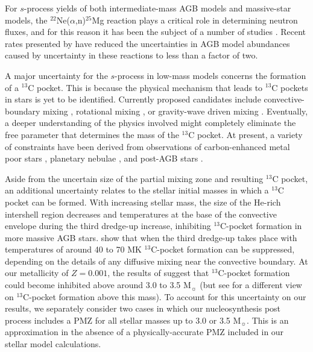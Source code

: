 For $s$-process yields of both intermediate-mass AGB models and massive-star models, the $^{22}$Ne($\alpha$,n)$^{25}$Mg reaction plays a critical role in determining neutron fluxes, and for this reason it has been the subject of a number of studies \citep{Angulo:1999kp,Jaeger:2001ch,Koehler:2002cf,Karakas:2006fk}. Recent rates presented by \citet{Longland:2012ix} have reduced the uncertainties in AGB model abundances caused by uncertainty in these reactions to less than a factor of two.

A major uncertainty for the $s$-process in low-mass models concerns the formation of a $^{13}$C pocket. This is because the physical mechanism that leads to $^{13}$C pockets in stars is yet to be identified. Currently proposed candidates include convective-boundary mixing \citep{Herwig:2000ua,Cristallo:2004us}, rotational mixing \citep{Herwig:2001vb,Piersanti:2013dh}, or gravity-wave driven mixing \citep{Denissenkov:2003gx}. Eventually, a deeper understanding of the physics involved might completely eliminate the free parameter that determines the mass of the $^{13}$C pocket. At present, a variety of constraints have been derived from observations of carbon-enhanced metal poor stars \citep{Izzard:2009hg,Bisterzo:2012bf,Lugaro:2012ht}, planetary nebulae \citep{Shingles:2013kg,Miszalski:2013gi}, and post-AGB stars \citep{BonacicMarinovic:2007jl,DeSmedt:2012dp}.

Aside from the uncertain size of the partial mixing zone and resulting $^{13}$C pocket, an additional uncertainty relates to the stellar initial masses in which a $^{13}$C pocket can be formed. With increasing stellar mass, the size of the He-rich intershell region decreases and temperatures at the base of the convective envelope during the third dredge-up increase, inhibiting $^{13}$C-pocket formation in more massive AGB stars. \citet{Goriely:2004gw} show that when the third dredge-up takes place with temperatures of around 40 to 70 MK $^{13}$C-pocket formation can be suppressed, depending on the details of any diffusive mixing near the convective boundary. At our metallicity of $Z=0.001$, the results of \citet{Goriely:2004gw} suggest that $^{13}$C-pocket formation could become inhibited above around 3.0 to 3.5 M$_\sun$ (but see \citet{Straniero:2014jk} for a different view on $^{13}$C-pocket formation above this mass). To account for this uncertainty on our results, we separately consider two cases in which our nucleosynthesis post process includes a PMZ for all stellar masses up to 3.0 or 3.5 M$_\sun$. This is an approximation in the absence of a physically-accurate PMZ included in our stellar model calculations.

